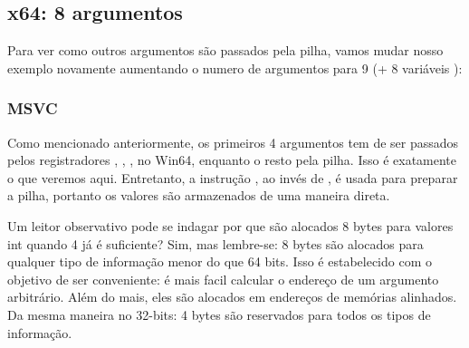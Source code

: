 \subsection{x64: 8 argumentos}

\label{example_printf8_x64}
Para ver como outros argumentos são passados pela pilha,
vamos mudar nosso exemplo novamente aumentando o numero de argumentos para 9 (\printf + 8 variáveis \Tint):



\subsubsection{MSVC}

Como mencionado anteriormente, os primeiros 4 argumentos tem de ser passados pelos registradores \RCX, \RDX, ,  no Win64, enquanto o resto pela pilha.
Isso é exatamente o que veremos aqui.
Entretanto, a instrução \MOV, ao invés de \PUSH, é usada para preparar a pilha, portanto os valores são armazenados de uma maneira direta.



Um leitor observativo pode se indagar por que são alocados 8 bytes para valores int quando 4 já é suficiente?
Sim, mas lembre-se: 8 bytes são alocados para qualquer tipo de informação menor do que 64 bits.
Isso é estabelecido com o objetivo de ser conveniente: é mais facil calcular o endereço de um argumento arbitrário.
Além do mais, eles são alocados em endereços de memórias alinhados. Da mesma maneira no 32-bits: 4 bytes são reservados para todos os tipos de informação.


\PTBRph{}

